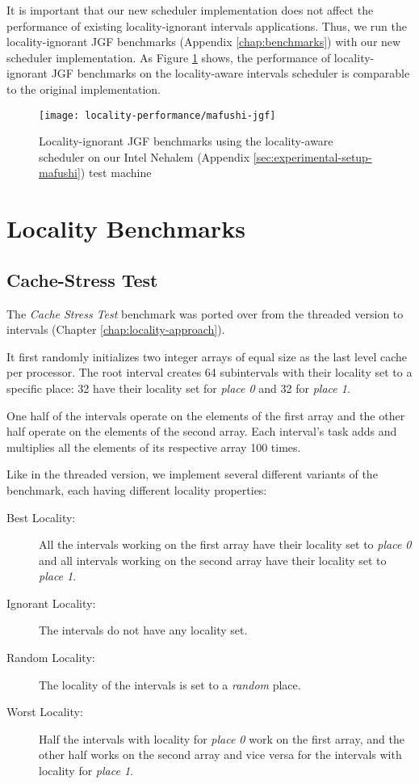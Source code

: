 It is important that our new scheduler implementation does not affect
the performance of existing locality-ignorant intervals
applications. Thus, we run the locality-ignorant JGF benchmarks
(Appendix \ref{chap:benchmarks}) with our new scheduler
implementation. As Figure \ref{fig:locality-performance-jgf} shows,
the performance of locality-ignorant JGF benchmarks on the
locality-aware intervals scheduler is comparable to the original
implementation.

\begin{figure}[!ht]
  \centering
  \texttt{[image: locality-performance/mafushi-jgf]}
  \caption[Locality-ignorant JGF benchmarks running on locality-aware
  scheduler]{Locality-ignorant JGF benchmarks using the locality-aware
    scheduler on our Intel Nehalem (Appendix
    \ref{sec:experimental-setup-mafushi}) test machine}
  \label{fig:locality-performance-jgf}
\end{figure}


\section{Locality Benchmarks}
\label{sec:locality-performance-locality}

\subsection{Cache-Stress Test}
\label{sec:locality-performance-cache-stress-test}

The \emph{Cache Stress Test} benchmark was ported over from the
threaded version to intervals (Chapter \ref{chap:locality-approach}).

It first randomly initializes two integer arrays of equal size as the
last level cache per processor. The root interval creates 64
subintervals with their locality set to a specific place: 32 have
their locality set for \emph{place 0} and 32 for \emph{place 1}.

One half of the intervals operate on the elements of the first array
and the other half operate on the elements of the second array. Each
interval's task adds and multiplies all the elements of its respective
array 100 times.

Like in the threaded version, we implement several different variants
of the benchmark, each having different locality properties:

\begin{description}
\item[Best Locality:] All the intervals working on the first array
  have their locality set to \emph{place 0} and all intervals working
  on the second array have their locality set to \emph{place 1}.
\item[Ignorant Locality:] The intervals do not have any locality set.
\item[Random Locality:] The locality of the intervals is set to a
  \emph{random} place.
\item[Worst Locality:] Half the intervals with locality for
  \emph{place 0} work on the first array, and the other half works on
  the second array and vice versa for the intervals with locality for
  \emph{place 1}.
\end{description}

